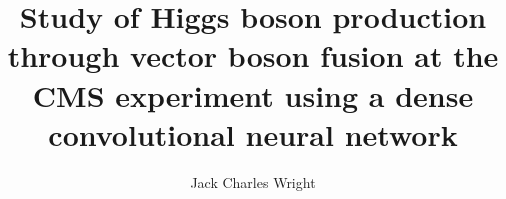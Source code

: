 \documentclass[hyperpdf,bindnopdf,10pt]{hepthesis}
\title{Study of Higgs boson production through vector boson fusion at the CMS experiment using a dense convolutional neural network}
\author{Jack Charles Wright}
\begin{document}
\begin{frontmatter}
    
\end{frontmatter}


\begin{mainmatter}

    \cleardoublepage

    

    

    

    

    

    

    

    

\end{mainmatter}


\appendix
\begin{appendices}
    
\end{appendices}


\begin{backmatter}
    
\end{backmatter}
\end{document}
